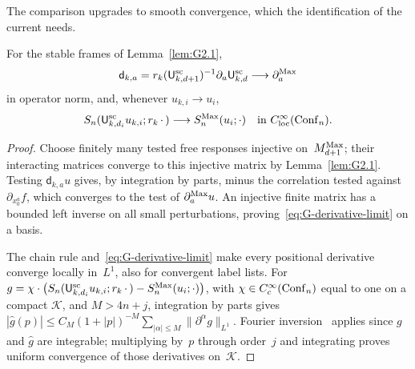 The comparison upgrades to smooth convergence, which the identification of the current needs.
\begin{corollary}\label{cor:G-smooth}
For the stable frames of Lemma~\ref{lem:G2.1},
\begin{equation}\label{eq:G-derivative-limit}
\mathsf d_{k,a}=r_k(\mathsf{U}_{k,d+1}^{\mathrm{sc}})^{-1}\partial_a\mathsf{U}_{k,d}^{\mathrm{sc}}\longrightarrow\partial_a^{\rm Max}
\end{equation}
in operator norm, and, whenever $u_{k,i}\to u_i$,
\begin{equation}\label{eq:G-smooth}
S_n(\mathsf{U}_{k,d_i}^{\mathrm{sc}}u_{k,i};r_k\,\cdot\,)
 \longrightarrow S^{\mathrm{Max}}_n(u_i;\cdot)
 \quad\text{in }C^\infty_{\rm loc}(\mathrm{Conf}_{n}).
\end{equation}
\end{corollary}
\begin{proof}
Choose finitely many tested free responses injective on~$M_{d+1}^{\mathrm{Max}}$; their interacting matrices converge to this injective matrix by Lemma~\ref{lem:G2.1}. Testing $\mathsf d_{k,a}u$ gives, by integration by parts, minus the correlation tested against $\partial_{x_0^a}f$, which converges to the test of $\partial_a^{\rm Max}u$. An injective finite matrix has a bounded left inverse on all small perturbations, proving~\eqref{eq:G-derivative-limit} on a basis.

The chain rule and~\eqref{eq:G-derivative-limit} make every positional derivative converge locally in~$L^1$, also for convergent label lists. For $g=\chi\cdot\bigl(S_n(\mathsf{U}_{k,d_i}^{\mathrm{sc}}u_{k,i};r_k\,\cdot\,)-S^{\mathrm{Max}}_n(u_i;\cdot)\bigr)$, with $\chi\in C_c^\infty(\mathrm{Conf}_{n})$ equal to one on a compact $\mathcal K$, and $M>4n+j$, integration by parts gives $|\widehat g(p)|\le C_M(1+|p|)^{-M}\sum_{|\alpha|\le M}\|\partial^\alpha g\|_{L^1}$. Fourier inversion~\cite[Theorem~8.26]{Folland1999} applies since $g$ and $\widehat g$ are integrable; multiplying by~$p$ through order~$j$ and integrating proves uniform convergence of those derivatives on~$\mathcal K$.
\end{proof}

